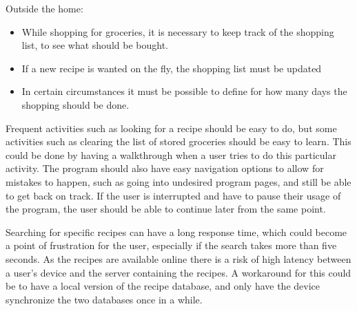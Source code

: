 Outside the home:
\begin{itemize}
\item While shopping for groceries, it is necessary to keep track of the shopping list, to see what should be bought.
\item If a new recipe is wanted on the fly, the shopping list must be updated
\item In certain circumstances it must be possible to define for how many days the shopping should be done.
\end{itemize}

Frequent activities such as looking for a recipe should be easy to do, but some activities such as clearing the list of stored groceries should be easy to learn. This could be done by having a walkthrough when a user tries to do this particular activity. The program should also have easy navigation options to allow for mistakes to happen, such as going into undesired program pages, and still be able to get back on track. If the user is interrupted and have to pause their usage of the program, the user should be able to continue later from the same point.

Searching for specific recipes can have a long response time, which could become a point of frustration for the user, especially if the search takes more than five seconds. As the recipes are available online there is a risk of high latency between a user's device and the server containing the recipes. A workaround for this could be to have a local version of the recipe database, and only have the device synchronize the two databases once in a while.
